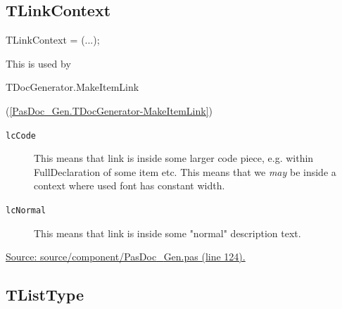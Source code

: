 \documentclass{report}
\newif\ifpdf
\begin{document}
\subsection*{TLinkContext}
\fi
\label{PasDoc_Gen-TLinkContext}
\begin{list}{}{
\setlength{\itemindent}{0cm}
\setlength{\listparindent}{0cm}
\setlength{\leftmargin}{\evensidemargin}
\addtolength{\leftmargin}{\tmplength}
\settowidth{\labelsep}{X}
\addtolength{\leftmargin}{\labelsep}
\setlength{\labelwidth}{\tmplength}
}
\item[\textbf{Declaration}\hfill]
\ifpdf
\begin{flushleft}
\fi
\begin{ttfamily}
TLinkContext = (...);\end{ttfamily}

\ifpdf
\end{flushleft}
\fi

\par
\item[\textbf{Description}]
This is used by \begin{ttfamily}TDocGenerator.MakeItemLink\end{ttfamily}(\ref{PasDoc_Gen.TDocGenerator-MakeItemLink})\item[\textbf{Values}]
\begin{description}
\item[\texttt{lcCode}] \label{PasDoc_Gen-lcCode}
\index{}
This means that link is inside some larger code piece, e.g. within FullDeclaration of some item etc. This means that we \textit{may} be inside a context where used font has constant width.
\item[\texttt{lcNormal}] \label{PasDoc_Gen-lcNormal}
\index{}
This means that link is inside some "normal" description text.
\end{description}
\par
\href{https://github.com/pasdoc/pasdoc/blob/master/source/component/PasDoc_Gen.pas#L124}{Source: source/component/PasDoc{\_}Gen.pas (line 124).}

\end{list}
\ifpdf
\subsection*{\large{\textbf{TListType}}\normalsize\hspace{1ex}\hrulefill}
\else
\end{document}
